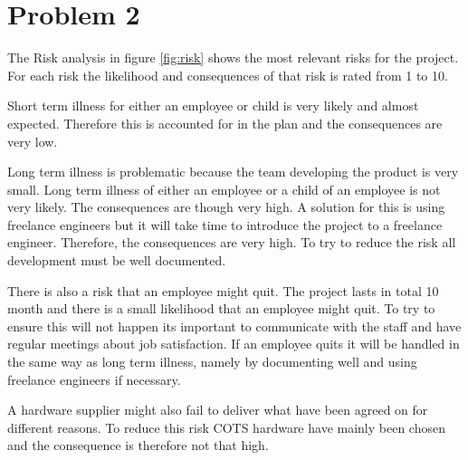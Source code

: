 \chapter{Problem 2}

The Risk analysis in figure \ref{fig:risk} shows the most relevant risks for the project. For each risk the likelihood and consequences of that risk is rated from 1 to 10.

Short term illness for either an employee or child is very likely and almost expected. Therefore this is accounted for in the plan and the consequences are very low.

Long term illness is problematic because the team developing the product is very small. Long term illness of either an employee or a child of an employee is not very likely. The consequences are though very high. A solution for this is using freelance engineers but it will take time to introduce the project to a freelance engineer. Therefore, the consequences are very high. To try to reduce the risk all development must be well documented.

There is also a risk that an employee might quit. The project lasts in total 10 month and there is a small likelihood that an employee might quit. To try to ensure this will not happen its important to communicate with the staff and have regular meetings about job satisfaction. If an employee quits it will be handled in the same way as long term illness, namely by documenting well and using freelance engineers if necessary. 

A hardware supplier might also fail to deliver what have been agreed on for different reasons. To reduce this risk COTS hardware have mainly been chosen and the consequence is therefore not that high.

